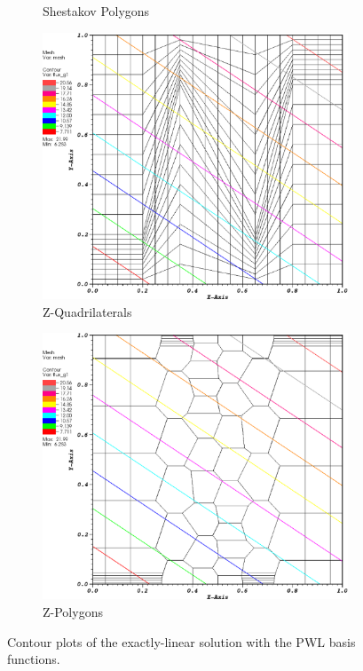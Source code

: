 \begin{figure}
{\begin{subfigure}[b]{0.45\textwidth}
		\caption{Shestakov Polygons}
	\end{subfigure}
}
\vspace{3mm}
{
	\begin{subfigure}[b]{0.45\textwidth}
		\centering
		\label{subfig::z_quad_pwld_lin_sol}
		\includegraphics[width=\textwidth]{figures/sec_BF/z_quad_PWLD_k1.eps}
		\caption{Z-Quadrilaterals}
	\end{subfigure}
	\hfill
	\begin{subfigure}[b]{0.45\textwidth}
		\centering
		\label{subfig::z_poly_pwld_lin_sol}
		\includegraphics[width=\textwidth]{figures/sec_BF/z_poly_PWLD_k1.eps}
		\caption{Z-Polygons}
	\end{subfigure}
}
\caption{Contour plots of the exactly-linear solution with the PWL basis functions.}
\label{fig::BF_Results_Linear_pwld_sol}
\end{figure}

